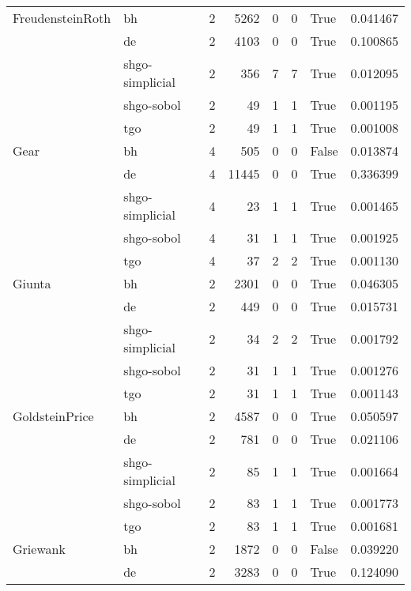 \begin{longtable}{llrrrrlr}
FreudensteinRoth & bh &     2 &     5262 &      0 &       0 &    True &    0.041467 \\
         & de &     2 &     4103 &      0 &       0 &    True &    0.100865 \\
         & shgo-simplicial &     2 &      356 &      7 &       7 &    True &    0.012095 \\
         & shgo-sobol &     2 &       49 &      1 &       1 &    True &    0.001195 \\
         & tgo &     2 &       49 &      1 &       1 &    True &    0.001008 \\
Gear & bh &     4 &      505 &      0 &       0 &   False &    0.013874 \\
         & de &     4 &    11445 &      0 &       0 &    True &    0.336399 \\
         & shgo-simplicial &     4 &       23 &      1 &       1 &    True &    0.001465 \\
         & shgo-sobol &     4 &       31 &      1 &       1 &    True &    0.001925 \\
         & tgo &     4 &       37 &      2 &       2 &    True &    0.001130 \\
Giunta & bh &     2 &     2301 &      0 &       0 &    True &    0.046305 \\
         & de &     2 &      449 &      0 &       0 &    True &    0.015731 \\
         & shgo-simplicial &     2 &       34 &      2 &       2 &    True &    0.001792 \\
         & shgo-sobol &     2 &       31 &      1 &       1 &    True &    0.001276 \\
         & tgo &     2 &       31 &      1 &       1 &    True &    0.001143 \\
GoldsteinPrice & bh &     2 &     4587 &      0 &       0 &    True &    0.050597 \\
         & de &     2 &      781 &      0 &       0 &    True &    0.021106 \\
         & shgo-simplicial &     2 &       85 &      1 &       1 &    True &    0.001664 \\
         & shgo-sobol &     2 &       83 &      1 &       1 &    True &    0.001773 \\
         & tgo &     2 &       83 &      1 &       1 &    True &    0.001681 \\
Griewank & bh &     2 &     1872 &      0 &       0 &   False &    0.039220 \\
         & de &     2 &     3283 &      0 &       0 &    True &    0.124090 \\

\end{longtable}
